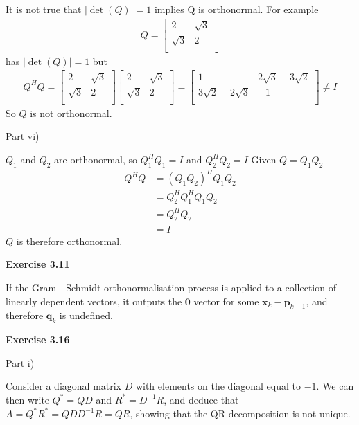 \documentclass[letterpaper,12pt]{article}
\newcommand{\vect}[1]{\mathbf{#1}}
\begin{document}
It is not true that $|\det(Q)| = 1$ implies Q is orthonormal. For example
\begin{align*}
  Q = 
  \begin{bmatrix}
    2 & \sqrt{3} \\
    \sqrt{3} & 2 \\
  \end{bmatrix}
\end{align*}
has $|\det(Q)| = 1$ but
\begin{align*}
  Q^HQ = 
  \begin{bmatrix}
    2 & \sqrt{3} \\
    \sqrt{3} & 2 \\
  \end{bmatrix}
  \begin{bmatrix}
    2 & \sqrt{3} \\
    \sqrt{3} & 2 \\
  \end{bmatrix}
  =
  \begin{bmatrix}
    1 & 2\sqrt{3} - 3\sqrt{2} \\
    3\sqrt{2} -  2\sqrt{3} & -1 \\
  \end{bmatrix}
  \neq I
\end{align*}
So $Q$ is not orthonormal.

\underline{Part vi)}

$Q_1$ and $Q_2$ are orthonormal, so $Q_1^HQ_1 = I$ and $Q_2^HQ_2 = I$
Given $Q = Q_1 Q_2$
\begin{align*}
  Q^HQ &= (Q_1Q_2)^HQ_1Q_2 \\
  &= Q_2^H Q_1^H Q_1 Q_2 \\
  &= Q_2^H Q_2 \\
  &= I
\end{align*}
$Q$ is therefore orthonormal.

\textbf{Exercise 3.11}

If the Gram–--Schmidt orthonormalisation process is applied to a collection of linearly dependent vectors, it outputs the $\vect{0}$ vector for some $\vect{x}_k - \vect{p}_{k-1}$, and therefore $\vect{q}_k$ is undefined. 

\textbf{Exercise 3.16}

\underline{Part i)}

Consider a diagonal matrix $D$ with elements on the diagonal equal to $-1$. We can then write $Q^* = QD$ and $R^* = D^{-1}R$, and deduce that $A = Q^* R^* = QDD^{-1}R = QR$, showing that the QR decomposition is not unique.
\end{document}
